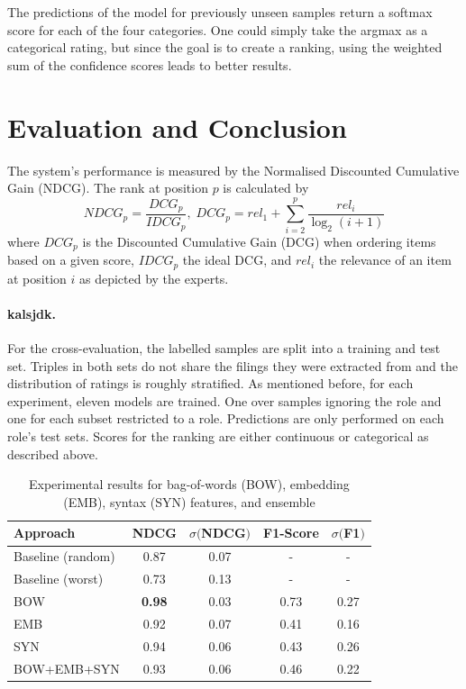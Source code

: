 The predictions of the model for previously unseen samples return a softmax score for each of the four categories.
One could simply take the argmax as a categorical rating, but since the goal is to create a ranking, using the weighted sum of the confidence scores leads to better results.

\section{Evaluation and Conclusion}
The system's performance is measured by the Normalised Discounted Cumulative Gain (NDCG). The rank at position $p$ is calculated by
\begin{equation}
NDCG_p = \frac{DCG_p}{IDCG_p},\;
DCG_p = rel_1 + \sum_{i=2}^{p} \frac{rel_i}{\log_2(i+1)}
\end{equation}
where $DCG_p$ is the Discounted Cumulative Gain (DCG) when ordering items based on a given score, $IDCG_p$ the ideal DCG, and $rel_i$ the relevance of an item at position $i$ as depicted by the experts.

\paragraph{\textbf{kalsjdk.}}
For the cross-evaluation, the labelled samples are split into a training and test set.
Triples in both sets do not share the filings they were extracted from and the distribution of ratings is roughly stratified.
As mentioned before, for each experiment, eleven models are trained. One over samples ignoring the role and one for each subset restricted to a role.
Predictions are only performed on each role's test sets.
Scores for the ranking are either continuous or categorical as described above.

\begin{table}
	\caption{Experimental results for bag-of-words (BOW), embedding (EMB), syntax (SYN) features, and ensemble}
	\label{tab:results}
	\begin{tabular}{lcccc}
		\toprule
		Approach & NDCG & $\sigma ($NDCG$)$ & F1-Score &  $\sigma ($F1$)$\\
		\midrule
		Baseline (random) & 0.87 & 0.07 & - & - \\
		Baseline (worst)  & 0.73 & 0.13 & - & - \\
		\midrule
		BOW & \textbf{0.98} & 0.03 & 0.73 & 0.27\\
		EMB & 0.92 & 0.07 & 0.41 & 0.16\\
		SYN & 0.94 & 0.06 & 0.43 & 0.26 \\
		BOW+EMB+SYN& 0.93 & 0.06 & 0.46 & 0.22\\
		\bottomrule
	\end{tabular}
\end{table}

